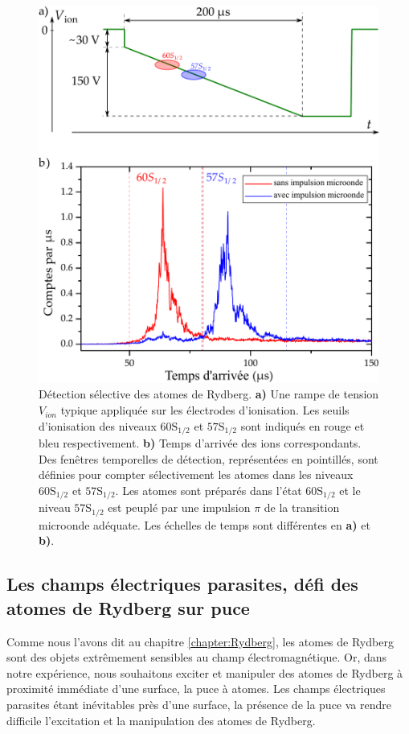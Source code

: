 \begin{figure}[!h]
\centering
\includegraphics[width=.7\linewidth]{figures/setup/rydberg/arrTimes6057}
\caption[Détection sélective des niveaux $\mathrm{60S_{1/2}}$ et $\mathrm{57S_{1/2}}$]{
Détection sélective des atomes de Rydberg.
\textbf{a)} Une rampe de tension $V_{ion}$ typique appliquée sur les électrodes d'ionisation.
Les seuils d'ionisation des niveaux $\mathrm{60S_{1/2}}$ et $\mathrm{57S_{1/2}}$ sont indiqués en rouge et bleu respectivement.
\textbf{b)} Temps d'arrivée des ions correspondants. Des fenêtres temporelles de détection, représentées en pointillés, sont définies pour compter sélectivement les atomes dans les niveaux $\mathrm{60S_{1/2}}$ et $\mathrm{57S_{1/2}}$.
Les atomes sont préparés dans l'état $\mathrm{60S_{1/2}}$ et le niveau $\mathrm{57S_{1/2}}$ est peuplé par une impulsion $\pi$ de la transition microonde adéquate.
Les échelles de temps sont différentes en \textbf{a)} et \textbf{b)}.
}
\label{fig:arrTimes6057}
\end{figure}
%


\newpage		
\subsection{Les champs électriques parasites, défi des atomes de Rydberg sur puce}\label{subsec:flashRb}
\noindent Comme nous l'avons dit au chapitre \ref{chapter:Rydberg}, les atomes de Rydberg sont des objets extrêmement sensibles au champ électromagnétique.
Or, dans notre expérience, nous souhaitons exciter et manipuler des atomes de Rydberg à proximité immédiate d'une surface, la puce à atomes.
Les champs électriques parasites étant inévitables près d'une surface, la présence de la puce va rendre difficile l'excitation et la manipulation des atomes de Rydberg.

